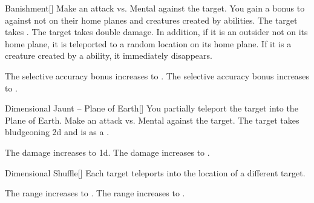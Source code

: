 \lowercase{\hypertarget{spell:Banishment}{}}\label{spell:Banishment}
\begin{freeability}[Rank 3]{\hypertarget{spell:Banishment}{Banishment}}[]
Make an attack vs. Mental against the target.
You gain a  bonus to  against  not on their home planes and creatures created by  abilities.
\hit The target takes .
\crit The target takes double damage.
In addition, if it is an outsider not on its home plane, it is teleported to a random location on its home plane.
If it is a creature created by a  ability, it immediately disappears.

\rankline
{} The selective accuracy bonus increases to .
 The selective accuracy bonus increases to .
\end{freeability}
\vspace{0.25em}



\lowercase{\hypertarget{spell:Dimensional Jaunt -- Plane of Earth}{}}\label{spell:Dimensional Jaunt -- Plane of Earth}
\begin{freeability}[Rank 3]{\hypertarget{spell:Dimensional Jaunt -- Plane of Earth}{Dimensional Jaunt -- Plane of Earth}}[]
You partially teleport the target into the Plane of Earth.
Make an attack vs. Mental against the target.
\hit The target takes bludgeoning  \minus2d and is  as a .

\rankline
{} The damage increases to  \minus1d.
 The damage increases to .
\end{freeability}
\vspace{0.25em}



\lowercase{\hypertarget{spell:Dimensional Shuffle}{}}\label{spell:Dimensional Shuffle}
\begin{freeability}[Rank 3]{\hypertarget{spell:Dimensional Shuffle}{Dimensional Shuffle}}[]
Each target teleports into the location of a different target.

\rankline
{} The range increases to \rnglong.
 The range increases to \rngext.
\end{freeability}
\vspace{0.25em}



